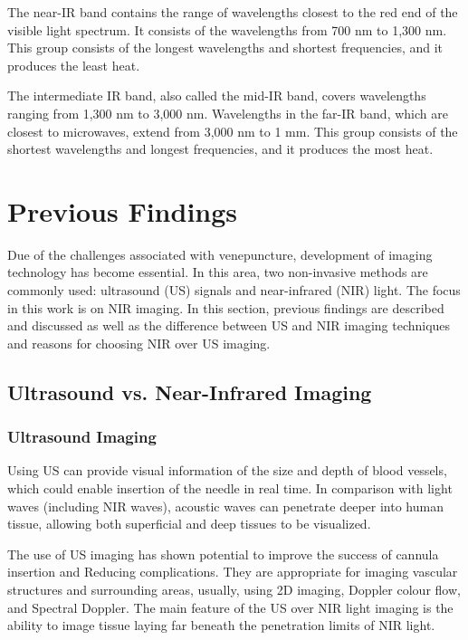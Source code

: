 The near-IR band contains the range of wavelengths closest to the red end of the visible light spectrum. It consists of the wavelengths from 700 nm to 1,300 nm. This group consists of the longest wavelengths and shortest frequencies, and it produces the least heat.

The intermediate IR band, also called the mid-IR band, covers wavelengths ranging from 1,300 nm to 3,000 nm. 
Wavelengths in the far-IR band, which are closest to microwaves, extend from 3,000 nm to 1 mm. This group consists of the shortest wavelengths and longest frequencies, and it produces the most heat.


\section{Previous Findings}

Due of the challenges associated with venepuncture, development of imaging technology has become essential. In this area, two non-invasive methods are commonly used: ultrasound (US) signals and near-infrared (NIR) light. The focus in this work is on NIR imaging.
In this section, previous findings are described and discussed as well as the difference between US and NIR imaging techniques and reasons for choosing NIR over US imaging.

\subsection{Ultrasound vs. Near-Infrared Imaging}

\subsubsection{Ultrasound Imaging}
Using US can provide visual information of the size and depth of blood vessels, which could enable insertion of the needle in real time. In comparison with light waves (including NIR waves), acoustic waves can penetrate deeper into human tissue, allowing both superficial and deep tissues to be visualized. 

The use of US imaging has shown potential to improve the success of cannula insertion and Reducing complications. They are appropriate for imaging vascular structures and surrounding areas, usually, using 2D imaging, Doppler colour flow, and Spectral Doppler. The main feature of the US over NIR light imaging is the ability to image tissue laying far beneath the penetration limits of NIR light. 

